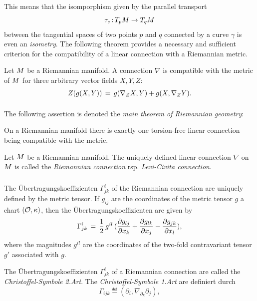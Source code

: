 \documentclass[11pt,twoside]{article}
\begin{document}
\subparagraph{}
This means that the isomporphism given by the parallel transport
\[
\tau_c \: T_p \difM \to T_q \difM
\]
between the tangential spaces of two points $p$ and $q$
connected by a curve $\gamma$ is even an \textit{isometry}.
The following theorem provides a necessary and sufficient criterion for the
compatibility of a linear connection with a Riemannian metric.

\begin{theorem}
Let $\difM$ be a Riemannian manifold.
A connection $\nabla$ is compatible with the metric of $\difM$
\iff for three arbitrary vector fields $X,Y,Z$:
\[
Z(g(X,Y)) \= g(\nabla_Z X,Y) + g(X,\nabla_Z Y).
\]
\end{theorem}

\paragraph{}
The following assertion is denoted the
\textit{main theorem of Riemannian geometry}:

\begin{theorem}
On a Riemannian manifold there is exactly one torsion-free
linear connection being compatible with the metric.
\end{theorem}

\begin{definition}
Let $\difM$ be a Riemannian manifold.
The uniquely defined linear connection $\nabla$ on $\difM$ is called
the \textit{Riemannian connection} rsp. \textit{Levi-Civita connection}.
\end{definition}

\subparagraph{}
The \"Ubertragungskoeffizienten $\Gamma^i_{jk}$ of the Riemannian connection
are uniquely defined by the metric tensor.
If $g_{ij}$ are the coordinates of the metric tensor $g$
{\wrt} a chart $(\Off,\kappa)$,
then the \"Uber\-tragungs\-koeffizien\-ten are given by
\[
\Gamma^i_{jk} \= \frac {1}{2} \, g^{il} \,
(\frac {\partial g_{lj}}{\partial x_k} +
 \frac {\partial g_{lk}}{\partial x_j} -
 \frac {\partial g_{jk}}{\partial x_l} ),
\]
where the magnitudes $g^{il}$ are the coordinates
of the two-fold contravariant tensor $g'$ associated with $g$.

\begin{definition}
The \"Ubertragungskoeffizienten $\Gamma^i_{jk}$ of a Riemannian connection
are called the \textit{Chri\-stof\-fel-Symbole 2.Art}.
The \textit{Christoffel-Symbole 1.Art} are definiert durch
\[
\Gamma_{ijk} \eqdef (\partial_i, \nabla_{\partial_k} \partial_j),
\]
\end{definition}
\end{document}
